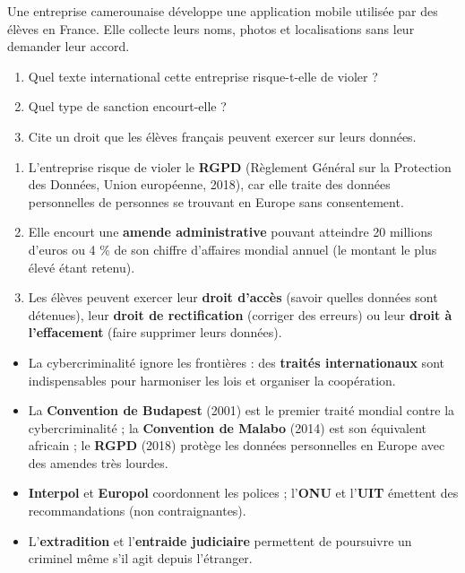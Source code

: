 \documentclass[11pt]{article}
\begin{document}
\begin{exercice}
Une entreprise camerounaise développe une application mobile utilisée par des élèves en France. Elle collecte leurs noms, photos et localisations sans leur demander leur accord.
\begin{enumerate}
\item Quel texte international cette entreprise risque-t-elle de violer ?
\item Quel type de sanction encourt-elle ?
\item Cite un droit que les élèves français peuvent exercer sur leurs données.
\end{enumerate}
\end{exercice}

\begin{corrige}
\begin{enumerate}
\item L'entreprise risque de violer le \textbf{RGPD} (Règlement Général sur la Protection des Données, Union européenne, 2018), car elle traite des données personnelles de personnes se trouvant en Europe sans consentement.
\item Elle encourt une \textbf{amende administrative} pouvant atteindre 20 millions d'euros ou 4 \% de son chiffre d'affaires mondial annuel (le montant le plus élevé étant retenu).
\item Les élèves peuvent exercer leur \textbf{droit d'accès} (savoir quelles données sont détenues), leur \textbf{droit de rectification} (corriger des erreurs) ou leur \textbf{droit à l'effacement} (faire supprimer leurs données).
\end{enumerate}
\end{corrige}

\begin{aretenir}
\begin{itemize}
\item La cybercriminalité ignore les frontières : des \textbf{traités internationaux} sont indispensables pour harmoniser les lois et organiser la coopération.
\item La \textbf{Convention de Budapest} (2001) est le premier traité mondial contre la cybercriminalité ; la \textbf{Convention de Malabo} (2014) est son équivalent africain ; le \textbf{RGPD} (2018) protège les données personnelles en Europe avec des amendes très lourdes.
\item \textbf{Interpol} et \textbf{Europol} coordonnent les polices ; l'\textbf{ONU} et l'\textbf{UIT} émettent des recommandations (non contraignantes).
\item L'\textbf{extradition} et l'\textbf{entraide judiciaire} permettent de poursuivre un criminel même s'il agit depuis l'étranger.
\end{itemize}
\end{aretenir}
\end{document}
